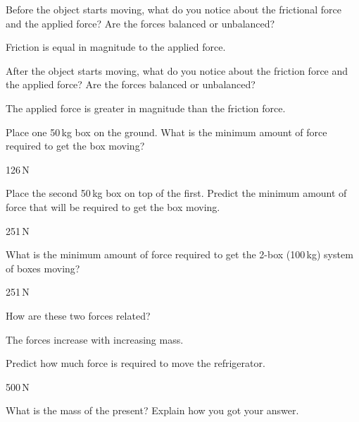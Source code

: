 \documentclass[]{exam}
\begin{document}
\begin{questions}
\question
Before the object starts moving, what do you notice about the frictional force and the applied force? Are the forces balanced or unbalanced?

\begin{solution}
    Friction is equal in magnitude to the applied force.
\end{solution}

\question 
After the object starts moving, what do you notice about the friction force and the applied force? Are the forces balanced or unbalanced?

\begin{solution}
    The applied force is greater in magnitude than the friction force.
\end{solution}

\question
Place one 50\,kg box on the ground. What is the minimum amount of force required to get the box moving?

\begin{solution}
    126\,N
\end{solution}

\question
Place the second 50\,kg box on top of the first. Predict the minimum amount of force that will be required to get the box moving.

\begin{solution}
    251\,N
\end{solution}

\question
What is the minimum amount of force required to get the 2-box (100\,kg) system of boxes moving?

\begin{solution}
    251\,N
\end{solution}

\question
How are these two forces related?

\begin{solution}
    The forces increase with increasing mass. 
\end{solution}

\question
Predict how much force is required to move the refrigerator.

\begin{solution}
    500\,N
\end{solution}

\question \label{HPDAU}
What is the mass of the present? Explain how you got your answer.

\end{questions}

\clearpage
\end{document}
